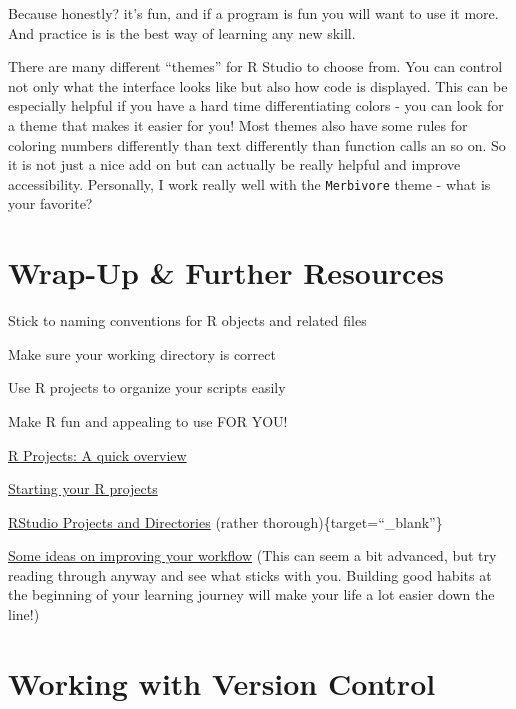 \documentclass[
]{book}
\begin{document}
Because honestly? it's fun, and if a program is fun you will want to use it more.
And practice is is the best way of learning any new skill.

There are many different ``themes'' for R Studio to choose from.
You can control not only what the interface looks like but also how code is displayed.
This can be especially helpful if you have a hard time differentiating colors - you can look for a theme that makes it easier for you!
Most themes also have some rules for coloring numbers differently than text differently than function calls an so on.
So it is not just a nice add on but can actually be really helpful and improve accessibility.
Personally, I work really well with the \texttt{Merbivore} theme - what is your favorite?

\section*{Wrap-Up \& Further Resources}\label{wrap-up-further-resources-2}

Stick to naming conventions for R objects and related files

Make sure your working directory is correct

Use R projects to organize your scripts easily

Make R fun and appealing to use FOR YOU!

\href{https://thedavidchen.github.io/post/rstudio-why-use-projects/}{R Projects: A quick overview}

\href{https://bookdown.org/daniel_dauber_io/r4np_book/starting-your-r-projects.html}{Starting your R projects}

\href{https://martinctc.github.io/blog/rstudio-projects-and-working-directories-a-beginner's-guide/}{RStudio Projects and Directories} (rather thorough)\{target=``\_blank''\}

\href{https://www.tidyverse.org/blog/2017/12/workflow-vs-script/}{Some ideas on improving your workflow} (This can seem a bit advanced, but try reading through anyway and see what sticks with you. Building good habits at the beginning of your learning journey will make your life a lot easier down the line!)

\section*{Working with Version Control}\label{working-with-version-control}
\end{document}
